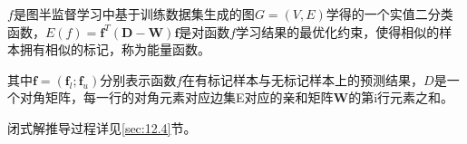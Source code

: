 
$f$是图半监督学习中基于训练数据集生成的图$G=(V,E)$学得的一个实值二分类函数，$E(f) = \boldsymbol{f}^{T}(\mathbf{D}-\mathbf{W}) \boldsymbol{f}$是对函数$f$学习结果的最优化约束，使得相似的样本拥有相似的标记，称为能量函数。

其中$\boldsymbol f = (\boldsymbol f_l; \boldsymbol f_u)$分别表示函数$f$在有标记样本与无标记样本上的预测结果，$D$是一个对角矩阵，每一行的对角元素对应边集E对应的亲和矩阵$\mathbf{W}$的第i行元素之和。

闭式解推导过程详见\ref{sec:12.4}节。



